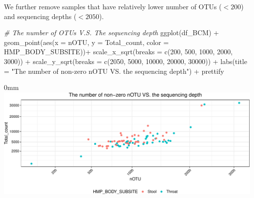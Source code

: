 \documentclass[]{article}
\newcommand{\hlnum}[1]{\textcolor[rgb]{0.816,0.125,0.439}{#1}}%
\newcommand{\hlstr}[1]{\textcolor[rgb]{0.251,0.627,0.251}{#1}}%
\newcommand{\hlcom}[1]{\textcolor[rgb]{0.502,0.502,0.502}{\textit{#1}}}%
\newcommand{\hlopt}[1]{\textcolor[rgb]{0,0,0}{#1}}%
\newcommand{\hlstd}[1]{\textcolor[rgb]{0.251,0.251,0.251}{#1}}%
\newcommand{\hlkwc}[1]{\textcolor[rgb]{0.251,0.251,0.251}{#1}}%
\newcommand{\hlkwd}[1]{\textcolor[rgb]{0.878,0.439,0.125}{#1}}%
\newenvironment{Shaded}{\begin{myshaded}}{\end{myshaded}}
\newcommand{\KeywordTok}[1]{\hlkwd{#1}}
\newcommand{\DataTypeTok}[1]{\hlkwc{#1}}
\newcommand{\DecValTok}[1]{\hlnum{#1}}
\newcommand{\StringTok}[1]{\hlstr{#1}}
\newcommand{\CommentTok}[1]{\hlcom{#1}}
\newcommand{\OperatorTok}[1]{\hlopt{#1}}
\newcommand{\NormalTok}[1]{\hlstd{#1}}
\begin{document}
We further remove samples that have relatively lower number of OTUs (\(<200\)) and sequencing depths (\(<2050\)).

\begin{Shaded}
\begin{Highlighting}[]
\CommentTok{# The number of OTUs  V.S. The sequencing depth}
\KeywordTok{ggplot}\NormalTok{(df_BCM) }\OperatorTok{+}
\StringTok{  }\KeywordTok{geom_point}\NormalTok{(}\KeywordTok{aes}\NormalTok{(}\DataTypeTok{x =}\NormalTok{ nOTU, }\DataTypeTok{y =}\NormalTok{ Total_count,}
                \DataTypeTok{color =}\NormalTok{ HMP_BODY_SUBSITE))}\OperatorTok{+}\StringTok{ }
\StringTok{  }\KeywordTok{scale_x_sqrt}\NormalTok{(}\DataTypeTok{breaks =} \KeywordTok{c}\NormalTok{(}\DecValTok{200}\NormalTok{, }\DecValTok{500}\NormalTok{, }\DecValTok{1000}\NormalTok{, }\DecValTok{2000}\NormalTok{, }\DecValTok{3000}\NormalTok{)) }\OperatorTok{+}
\StringTok{  }\KeywordTok{scale_y_sqrt}\NormalTok{(}\DataTypeTok{breaks =} \KeywordTok{c}\NormalTok{(}\DecValTok{2050}\NormalTok{, }\DecValTok{5000}\NormalTok{, }\DecValTok{10000}\NormalTok{, }\DecValTok{20000}\NormalTok{, }\DecValTok{30000}\NormalTok{)) }\OperatorTok{+}
\StringTok{  }\KeywordTok{labs}\NormalTok{(}\DataTypeTok{title =} \StringTok{"The number of non-zero nOTU VS. the sequencing depth"}\NormalTok{) }\OperatorTok{+}
\StringTok{  }\NormalTok{prettify }
\end{Highlighting}
\end{Shaded}

\begin{adjustwidth}{\fltoffset}{0mm}
\includegraphics{figure/unnamed-chunk-64-1} \end{adjustwidth}

\begin{Shaded}
\end{Shaded}
\end{document}
